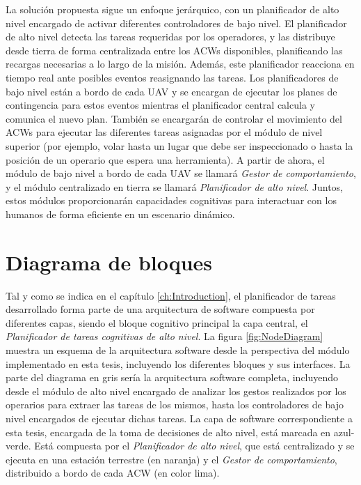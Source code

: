 \documentclass[fontsize=11pt, English=false, Español=true, Myfinal=true, twoside, numbers=noenddot]{scrbook}
\begin{document}
{La solución propuesta sigue un enfoque jerárquico, con un planificador de alto nivel encargado de activar diferentes controladores de bajo nivel. El planificador de alto nivel detecta las tareas requeridas por los operadores, y las distribuye desde tierra de forma centralizada entre los \glspl{ACW} disponibles, planificando las recargas necesarias a lo largo de la misión. Además, este planificador reacciona en tiempo real ante posibles eventos reasignando las tareas. Los planificadores de bajo nivel están a bordo de cada \gls{UAV} y se encargan de ejecutar los planes de contingencia para estos eventos mientras el planificador central calcula y comunica el nuevo plan. También se encargarán de controlar el movimiento del \glspl{ACW} para ejecutar las diferentes tareas asignadas por el módulo de nivel superior (por ejemplo, volar hasta un lugar que debe ser inspeccionado o hasta la posición de un operario que espera una herramienta). A partir de ahora, el módulo de bajo nivel a bordo de cada \gls{UAV} se llamará \emph{Gestor de comportamiento}, y el módulo centralizado en tierra se llamará \emph{Planificador de alto nivel}. Juntos, estos módulos proporcionarán capacidades cognitivas para interactuar con los humanos de forma eficiente en un escenario dinámico. 

\section{Diagrama de bloques}
\label{sec:NodeDiagram}
Tal y como se indica en el capítulo \ref{ch:Introduction}, el planificador de tareas desarrollado forma parte de una arquitectura de software compuesta por diferentes capas, siendo el bloque cognitivo principal la capa central, el \emph{Planificador de tareas cognitivas de alto nivel}. La figura \ref{fig:NodeDiagram} muestra un esquema de la arquitectura software desde la perspectiva del módulo implementado en esta tesis, incluyendo los diferentes bloques y sus interfaces. La parte del diagrama en gris sería la arquitectura software completa, incluyendo desde el módulo de alto nivel encargado de analizar los gestos realizados por los operarios para extraer las tareas de los mismos, hasta los controladores de bajo nivel encargados de ejecutar dichas tareas. La capa de software correspondiente a esta tesis, encargada de la toma de decisiones de alto nivel, está marcada en azul-verde. Está compuesta por el \emph{Planificador de alto nivel}, que está centralizado y se ejecuta en una estación terrestre (en naranja) y el \emph{Gestor de comportamiento}, distribuido a bordo de cada \gls{ACW} (en color lima).

}
\end{document}
